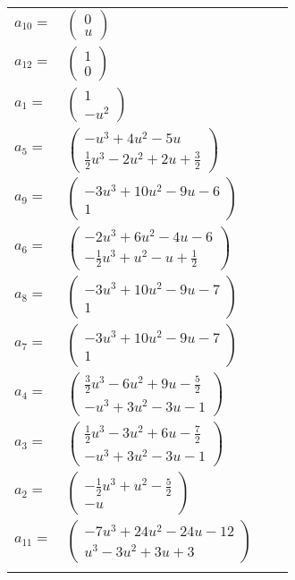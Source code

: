 \documentclass[1p]{elsarticle_modified}
\theoremstyle{definition}
\begin{document}
\begin{tabular}{m{7pt} m{180pt} m{7pt} m{180pt} }
\flushright $a_{10}=$&$\begin{pmatrix}0\\u\end{pmatrix}$ \\
\flushright $a_{12}=$&$\begin{pmatrix}1\\0\end{pmatrix}$ \\
\flushright $a_{1}=$&$\begin{pmatrix}1\\- u^2\end{pmatrix}$ \\
\flushright $a_{5}=$&$\begin{pmatrix}- u^3+4 u^2-5 u\\\frac{1}{2} u^3-2 u^2+2 u+\frac{3}{2}\end{pmatrix}$ \\
\flushright $a_{9}=$&$\begin{pmatrix}-3 u^3+10 u^2-9 u-6\\1\end{pmatrix}$ \\
\flushright $a_{6}=$&$\begin{pmatrix}-2 u^3+6 u^2-4 u-6\\-\frac{1}{2} u^3+u^2- u+\frac{1}{2}\end{pmatrix}$ \\
\flushright $a_{8}=$&$\begin{pmatrix}-3 u^3+10 u^2-9 u-7\\1\end{pmatrix}$ \\
\flushright $a_{7}=$&$\begin{pmatrix}-3 u^3+10 u^2-9 u-7\\1\end{pmatrix}$ \\
\flushright $a_{4}=$&$\begin{pmatrix}\frac{3}{2} u^3-6 u^2+9 u-\frac{5}{2}\\- u^3+3 u^2-3 u-1\end{pmatrix}$ \\
\flushright $a_{3}=$&$\begin{pmatrix}\frac{1}{2} u^3-3 u^2+6 u-\frac{7}{2}\\- u^3+3 u^2-3 u-1\end{pmatrix}$ \\
\flushright $a_{2}=$&$\begin{pmatrix}-\frac{1}{2} u^3+u^2-\frac{5}{2}\\- u\end{pmatrix}$ \\
\flushright $a_{11}=$&$\begin{pmatrix}-7 u^3+24 u^2-24 u-12\\u^3-3 u^2+3 u+3\end{pmatrix}$\\&\end{tabular}
\end{document}
